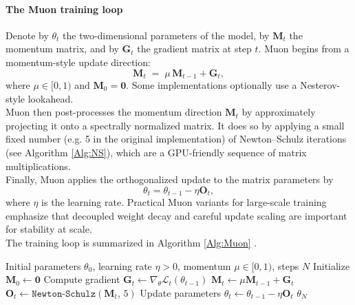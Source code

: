\paragraph*{The Muon training loop}
Denote by $\theta_t$ the two-dimensional parameters of the model, by $\mathbf{M}_t$ the momentum matrix, and by $\mathbf{G}_t$ the gradient matrix at step $t$. Muon begins from a momentum-style update direction:
\begin{equation}
\mathbf{M}_t \;=\; \mu\,\mathbf{M}_{t-1} + \mathbf{G}_t,
\label{eq:muon_momentum}
\end{equation}
where $\mu\in[0,1)$ and $\mathbf{M}_0=\mathbf{0}$. Some implementations optionally use a Nesterov-style lookahead. \\
Muon then post-processes the momentum direction $\mathbf{M}_t$ by approximately projecting it onto a spectrally normalized matrix. It does so by applying a small fixed number (e.g. 5 in the original implementation) of Newton--Schulz iterations (see Algorithm \ref{Alg:NS}), which are a GPU-friendly sequence of matrix multiplications. \\
Finally, Muon applies the orthogonalized update to the matrix parameters by
\begin{equation}
 \theta_t = \theta_{t-1} - \eta \mathbf{O}_t,
\label{eq:muon_update}
\end{equation}
where $\eta$ is the learning rate. Practical Muon variants for large-scale training emphasize that decoupled weight decay and careful update scaling are important for stability at scale. \\
The training loop is summarized in Algorithm \ref{Alg:Muon} \cite{jordan2024muon}.
\begin{algorithm}[H]
\caption{Muon}
\label{Alg:Muon}
\begin{algorithmic}[1]
\REQUIRE Initial parameters $\theta_0$, learning rate $\eta > 0$, momentum $\mu \in [0,1)$, steps $N$
\STATE Initialize $\mathbf{M}_0 \leftarrow \mathbf{0}$
    \STATE Compute gradient $\mathbf{G}_t \leftarrow \nabla_\theta \mathcal{L}_t(\theta_{t-1})$
    \STATE      $\mathbf{M}_t \leftarrow \mu \mathbf{M}_{t-1} + \mathbf{G}_t$
    \STATE      $\mathbf{O}_t \leftarrow \texttt{Newton-Schulz}(\mathbf{M}_t,\, 5)$
    \STATE Update parameters $\theta_t \leftarrow \theta_{t-1} - \eta \mathbf{O}_t$
\ENDFOR
\RETURN $\theta_N$
\end{algorithmic}
\end{algorithm}

